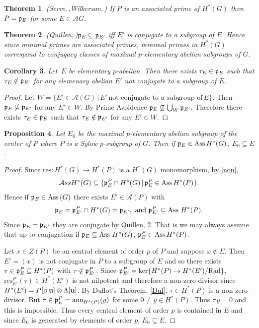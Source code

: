 \documentclass[reqno]{amsart}
\theoremstyle{plain}%
\newtheorem{thm}{Theorem}[section]
\newtheorem{prop}[thm]{Proposition}
\newtheorem{cor}[thm]{Corollary}
\theoremstyle{definition}
\theoremstyle{remark}
\newcommand\vv{\,\vert\,}
\newcommand\sub{\subseteq}
\newcommand\mc[1]{\mathcal #1}
\newcommand\as{\text{Ass}\,}
\newcommand\res{\text{res}}
\begin{document}
\begin{thm}(Serre,\,\cite{Se},Wilkerson,\,\cite{W}) If $P$ is an associated prime of $H^*(G)$ then $P=\frak p_E$ for some $E\in\mc AG$.
\end{thm}

\begin{thm}(Quillen,\,\cite{Q})\label{Qu} $\frak p_E\sub \frak p_{E'}$ iff $E'$ is conjugate to a subgroup of $E$. Hence since minimal primes are associated primes, minimal primes in $H^*(G)$ correspond to conjugacy classes of maximal $p$-elementary abelian subgroups of $G$. \end{thm}

\begin{cor} Let \,$E$ be elementary $p$-abelian.  Then there exists $\tau_E\in\frak p_E$ such that $\tau_{E}\notin\frak p_{E'}$ for any elemenary abelian $E'$ not conjugate to a subgroup of $E$.\end{cor}
\begin{proof} Let $W=\{E'\in\mathcal A(G)\vv E'\,\text{not conjugate to a subgroup of}\,E\}$. Then $\frak p_E\not\subseteq \frak p_{E'}$ for any $E'\in W$.  By Prime Avoidence $\frak p_E\not\subseteq\bigcup_W\frak p_{E'}$.  Therefore there exists $\tau_E\in\frak p_E$ such that $\tau_{E}\notin\frak p_{E'}$ for any $E'\in W$. \end{proof} 

\begin{prop}\label{E0} Let $E_0$ be the maximal $p$-elementary abelian subgroup of the center of $P$ where $P$ is a Sylow $p$-subgroup of $G$.  Then if $\frak p_E\in\as H^*(G)$, $E_0\sub E$.\end{prop}
\begin{proof} Since $\res:H^*(G)\to H^*(P)$ is a $H^*(G)$ monomorphism, by \ref{non}, $$\mc Ass H^*(G)\sub\{\frak p^P_E\cap H^*(G)\vv \frak p^P_E\in\as H^*(P)\}.$$  Hence if $\frak p_E\in\as(G)$ there exists $E'\in \mc A(P)$
with $$\frak p_E=\frak p^P_{E'}\cap H^*(G)=\frak p_{E'}, \text{ and } \frak p^P_{E'}\sub \as\,H^*(P).$$ 
Since $\frak p_E=\frak p_{E'}$ they are conjugate by Quillen, \ref{Qu}.  That is we may always assume that up to conjugation if $\frak p_E\sub \as\, H^*(G)$, $\frak p^P_E\in\as H^*(P)$.  

Let $x\in Z(P)$ be an central element of order $p$ of $P$ and suppose $x\notin E$. Then $E'=(x)$ is not conjugate in $P$ to a subgroup of $E$ and so there exists $\tau\in\frak p^P_E\sub H^*(P)$ with $\tau\notin\frak p^P_{E'}$.  Since $\frak p^P_{E'}=\ker\{H^*(P)\to H^*(E')/\text{Rad}\}$,
$\text{res}^P_{E'}(\tau)\in H^*(E')$ is not nilpotent and therefore a non-zero divisor since $H^*(E')=P[\beta\,\bold u]\otimes \Lambda[\bold u]$. By Duflot's Theorem, \ref{Duf}, $\tau\in H^*(P)$ is a non zero-divisor. But $\tau\in\frak p^P_E=\text{ann}_{H^*(P)}(y)$ for some $0\neq y\in H^*(P)$.  Thus $\tau\,y=0$ and this is impossible.  Thus every central element of order $p$ is contained in $E$ and since $E_0$ is generated by elements of order $p$,  $E_0\sub E$.\end{proof}
\end{document}
